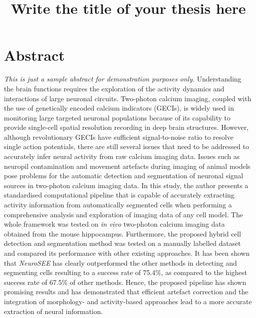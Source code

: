 \documentclass[a4paper, twoside]{report}
\title{Write the title of your thesis here}
\begin{document}


\section*{Abstract} \large 
\hspace{\parindent} \textit{This is just a sample abstract for demonstration purposes only.} Understanding the brain functions requires the exploration of the activity dynamics and interactions of large neuronal circuits. Two-photon calcium imaging, coupled with the use of genetically encoded calcium indicators (GECIs), is widely used in monitoring large targeted neuronal populations because of its capability to provide single-cell spatial resolution recording in deep brain structures. However, although revolutionary GECIs have sufficient signal-to-noise ratio to resolve single action potentials, there are still several issues that need to be addressed to accurately infer neural activity from raw calcium imaging data. Issues such as neuropil contamination and movement artefacts during imaging of animal models pose problems for the automatic detection and segmentation of neuronal signal sources in two-photon calcium imaging data. In this study, the author presents a standardised computational pipeline that is capable of accurately extracting activity information from automatically segmented cells when performing a comprehensive analysis and exploration of imaging data of any cell model. The whole framework was tested on \textit{in vivo} two-photon calcium imaging data obtained from the mouse hippocampus. Furthermore, the proposed hybrid cell detection and segmentation method was tested on a manually labelled dataset and compared its performance with other existing approaches. It has been shown that \textit{NeuroSEE} has clearly outperformed the other methods in detecting and segmenting cells resulting to a success rate of 75.4\%, as compared to the highest success rate of 67.5\% of other methods. Hence, the proposed pipeline has shown promising results and has demonstrated that efficient artefact correction and the integration of morphology- and activity-based approaches lead to a more accurate extraction of neural information. 

\clearpage

\end{document}
